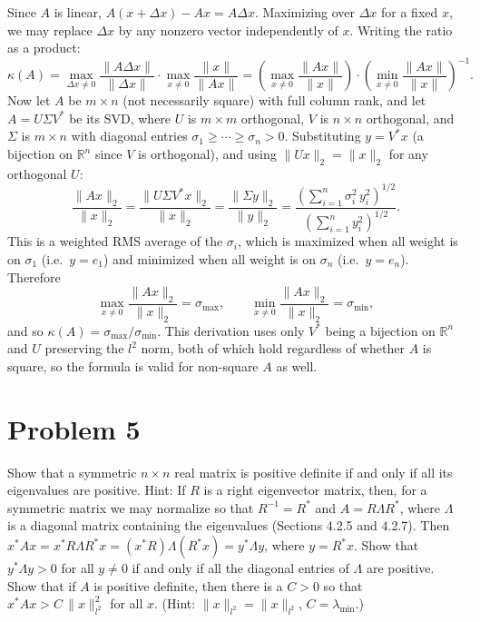 \documentclass[letterpaper, 11pt]{article}
\newcommand{\R}{\mathbb{R}}   %
\newcommand{\1}{\mathds{1}}	%
\theoremstyle{definition}
\begin{document}
Since $A$ is linear, $A(x + \Delta x) - Ax = A\Delta x$. Maximizing over $\Delta x$ for a fixed $x$, we may replace $\Delta x$ by any nonzero vector independently of $x$. Writing the ratio as a product:
\[
\kappa(A) = \max_{\Delta x \neq 0} \frac{\|A\Delta x\|}{\|\Delta x\|} \cdot \max_{x \neq 0} \frac{\|x\|}{\|Ax\|} = \left(\max_{x \neq 0}\frac{\|Ax\|}{\|x\|}\right) \cdot \left(\min_{x \neq 0}\frac{\|Ax\|}{\|x\|}\right)^{-1}.
\]
Now let $A$ be $m \times n$ (not necessarily square) with full column rank, and let $A = U \Sigma V^*$ be its SVD, where $U$ is $m \times m$ orthogonal, $V$ is $n \times n$ orthogonal, and $\Sigma$ is $m \times n$ with diagonal entries $\sigma_1 \geq \cdots \geq \sigma_n > 0$. Substituting $y = V^* x$ (a bijection on $\R^n$ since $V$ is orthogonal), and using $\|Ux\|_2 = \|x\|_2$ for any orthogonal $U$:
\[
\frac{\|Ax\|_2}{\|x\|_2} = \frac{\|U\Sigma V^* x\|_2}{\|x\|_2} = \frac{\|\Sigma y\|_2}{\|y\|_2} = \frac{\left(\sum_{i=1}^n \sigma_i^2\, y_i^2\right)^{1/2}}{\left(\sum_{i=1}^n y_i^2\right)^{1/2}}.
\]
This is a weighted RMS average of the $\sigma_i$, which is maximized when all weight is on $\sigma_1$ (i.e.\ $y = e_1$) and minimized when all weight is on $\sigma_n$ (i.e.\ $y = e_n$). Therefore
\[
\max_{x \neq 0}\frac{\|Ax\|_2}{\|x\|_2} = \sigma_{\max}, \qquad \min_{x \neq 0}\frac{\|Ax\|_2}{\|x\|_2} = \sigma_{\min},
\]
and so $\kappa(A) = \sigma_{\max}/\sigma_{\min}$. This derivation uses only $V^*$ being a bijection on $\R^n$ and $U$ preserving the $l^2$ norm, both of which hold regardless of whether $A$ is square, so the formula is valid for non-square $A$ as well.
\section*{Problem 5}

Show that a symmetric $n \times n$ real matrix is positive definite if and only if all its eigenvalues are positive. Hint: If $R$ is a right eigenvector matrix, then, for a symmetric matrix we may normalize so that $R^{-1} = R^*$ and $A = R\Lambda R^*$, where $\Lambda$ is a diagonal matrix containing the eigenvalues (Sections 4.2.5 and 4.2.7). Then $x^*Ax = x^*R\Lambda R^*x = (x^*R)\Lambda(R^*x) = y^*\Lambda y$, where $y = R^*x$. Show that $y^*\Lambda y > 0$ for all $y \neq 0$ if and only if all the diagonal entries of $\Lambda$ are positive. Show that if $A$ is positive definite, then there is a $C > 0$ so that $x^*Ax > C\,\|x\|_{l^2}^2$ for all $x$. (Hint: $\|x\|_{l^2} = \|x\|_{l^2}$, $C = \lambda_{\min}$.)
\end{document}
